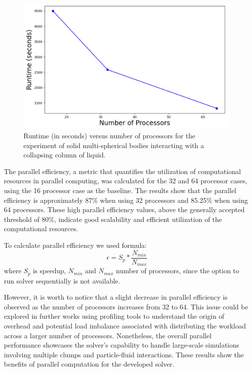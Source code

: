 
\begin{figure}[H]
    \centering
    \includegraphics[width=15cm]{GWU_Thesis_Sarmakeeva/Images/chap3/parallel_runtime.png}
    \caption{Runtime (in seconds) versus number of processors for the experiment of solid multi-spherical bodies interacting with a collapsing column of liquid. }
    \label{fig:runtime}
\end{figure}

The parallel efficiency, a metric that quantifies the utilization of computational resources in parallel computing, was calculated for the 32 and 64 processor cases, using the 16 processor case as the baseline. The results show that the parallel efficiency is approximately 87\% when using 32 processors and 85.25\% when using 64 processors. These high parallel efficiency values, above the generally accepted threshold of 80\%, indicate good scalability and efficient utilization of the computational resources.

To calculate parallel efficiency we used formula:
$$\epsilon = S_p * \frac {N_{min}}{N_{max}}$$
where $S_p$ is speedup, $N_{min}$ and $N_{max}$ number of processors, since the option to run solver sequentially is not available.

However, it is worth to notice that a slight decrease in parallel efficiency is observed as the number of processors increases from 32 to 64. This issue could be explored in further works using profiling tools to understand the origin of overhead and potential load imbalance associated with distributing the workload across a larger number of processors. Nonetheless, the overall parallel performance showcases the solver's capability to handle large-scale simulations involving multiple clumps and particle-fluid interactions. These results show the benefits of parallel computation for the developed solver.

